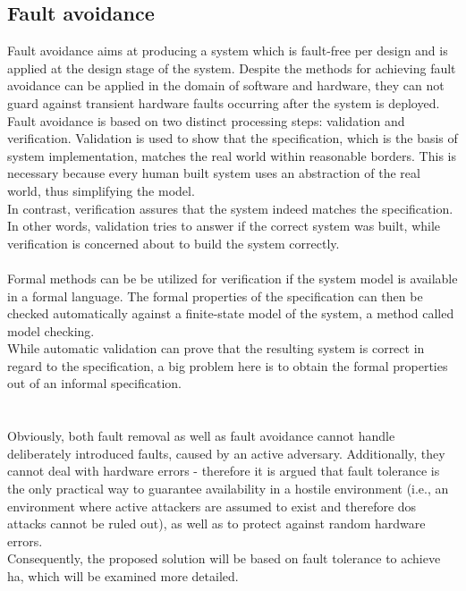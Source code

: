 \subsection{Fault avoidance}
Fault avoidance aims at producing a system which is fault-free
per design and is applied at the design stage of the system. Despite the methods for achieving fault avoidance can be applied in the domain of software and hardware,
they can not guard against transient hardware faults occurring after the system is deployed.
\\
Fault avoidance is based on two distinct processing steps: validation and verification. Validation is used to show that the specification, which is
the basis of system implementation, matches the real world within reasonable borders. This is necessary because every human built system uses an abstraction
of the real world, thus simplifying the model.
\\
In contrast, verification assures that the system indeed matches the specification. In other words, validation tries to answer if the correct system was built,
while verification is concerned about to build the system correctly.
\\
\\
Formal methods can be be utilized for verification if the system model is available in a formal language. The formal properties of the specification can then be 
checked automatically against a finite-state model of the system, a method called model checking.
\\
While automatic validation can prove that the resulting system is correct in regard to the specification, a big problem here is to obtain the formal properties
out of an informal specification.
\\
\\
\\
Obviously, both fault removal as well as fault avoidance cannot handle deliberately introduced faults, caused by an active adversary.
Additionally, they cannot deal with hardware errors -  therefore it is argued that fault tolerance is the only practical way to guarantee availability
in a hostile environment (i.e., an environment where active attackers are assumed to exist and therefore \gls{dos} attacks cannot be ruled out), as well as to
protect against random hardware errors.
\\
Consequently, the proposed solution will be based on fault tolerance to achieve \gls{ha}, which will be examined more detailed.
 
